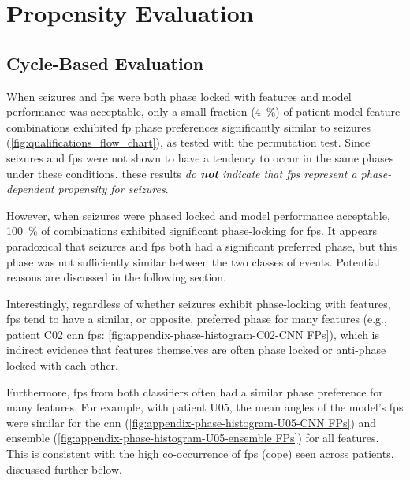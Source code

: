 \section{Propensity Evaluation}\label{sec:discussion-propensity-evaluation}


\subsection{Cycle-Based Evaluation}
When seizures and \glspl{fp} were both phase locked with features and model performance was acceptable, only a small fraction (\SI{4}{\percent}) of patient-model-feature combinations exhibited \gls{fp} phase preferences significantly similar to seizures (\cref{fig:qualifications_flow_chart}), as tested with the permutation test.
Since seizures and \glspl{fp} were not shown to have a tendency to occur in the same phases under these conditions, these results \textit{do \textbf{not} indicate that \glspl{fp} represent a phase-dependent propensity for seizures}.

However, when seizures were phased locked and model performance acceptable, \SI{100}{\percent} of combinations exhibited significant phase-locking for \glspl{fp}.
It appears paradoxical that seizures and \glspl{fp} both had a significant preferred phase, but this phase was not sufficiently similar between the two classes of events.
Potential reasons are discussed in the following section.

Interestingly, regardless of whether seizures exhibit phase-locking with features, \glspl{fp} tend to have a similar, or opposite, preferred phase for many features (e.g., patient C02 \gls{cnn} \glspl{fp}: \cref{fig:appendix-phase-histogram-C02-CNN FPs}), which is indirect evidence that features themselves are often phase locked or anti-phase locked with each other.

Furthermore, \glspl{fp} from both classifiers often had a similar phase preference for many features.
For example, with patient U05, the mean angles of the model's \glspl{fp} were similar for the \gls{cnn} (\cref{fig:appendix-phase-histogram-U05-CNN FPs}) and ensemble (\cref{fig:appendix-phase-histogram-U05-ensemble FPs}) for all features.
This is consistent with the high co-occurrence of \glspl{fp} (\gls{cope}) seen across patients, discussed further below.



